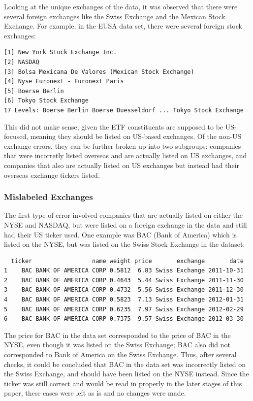 \documentclass[12pt,twoside]{reedthesis}
\newenvironment{Shaded}{\begin{snugshade}}{\end{snugshade}}
\newcommand{\KeywordTok}[1]{\textcolor[rgb]{0.13,0.29,0.53}{\textbf{{#1}}}}
\newcommand{\StringTok}[1]{\textcolor[rgb]{0.31,0.60,0.02}{{#1}}}
\newcommand{\CommentTok}[1]{\textcolor[rgb]{0.56,0.35,0.01}{\textit{{#1}}}}
\newcommand{\NormalTok}[1]{{#1}}
\theoremstyle{definition}
\theoremstyle{definition}
\theoremstyle{definition}
\theoremstyle{remark}
\begin{document}
Looking at the unique exchanges of the data, it was observed that there
were several foreign exchanges like the Swiss Exchange and the Mexican
Stock Exchange. For example, in the EUSA data set, there were several
foreign stock exchanges:
\begin{Shaded}
\end{Shaded}
\begin{verbatim}
[1] New York Stock Exchange Inc.                      
[2] NASDAQ                                            
[3] Bolsa Mexicana De Valores (Mexican Stock Exchange)
[4] Nyse Euronext - Euronext Paris                    
[5] Boerse Berlin                                     
[6] Tokyo Stock Exchange                              
17 Levels: Boerse Berlin Boerse Duesseldorf ... Tokyo Stock Exchange
\end{verbatim}
This did not make sense, given the ETF constituents are supposed to be
US-focused, meaning they should be listed on US-based exchanges. Of the
non-US exchange errors, they can be further broken up into two
subgroups: companies that were incorretly listed overseas and are
actually listed on US exchanges, and companies that also are actually
listed on US exchanges but instead had their overseas exchange tickers
listed.

\subsubsection{Mislabeled Exchanges}\label{mislabeled-exchanges}

The first type of error involved companies that are actually listed on
either the NYSE and NASDAQ, but were listed on a foreign exchange in the
data and still had their US ticker used. One example was BAC (Bank of
America) which is listed on the NYSE, but was listed on the Swiss Stock
Exchange in the dataset:
\begin{verbatim}
  ticker                 name weight price       exchange       date
1    BAC BANK OF AMERICA CORP 0.5812  6.83 Swiss Exchange 2011-10-31
2    BAC BANK OF AMERICA CORP 0.4643  5.44 Swiss Exchange 2011-11-30
3    BAC BANK OF AMERICA CORP 0.4732  5.56 Swiss Exchange 2011-12-30
4    BAC BANK OF AMERICA CORP 0.5823  7.13 Swiss Exchange 2012-01-31
5    BAC BANK OF AMERICA CORP 0.6235  7.97 Swiss Exchange 2012-02-29
6    BAC BANK OF AMERICA CORP 0.7375  9.57 Swiss Exchange 2012-03-30
\end{verbatim}
The price for BAC in the data set corresponded to the price of BAC in
the NYSE, even though it was listed on the Swiss Exchange; BAC also did
not corresponded to Bank of America on the Swiss Exchange. Thus, after
several checks, it could be concluded that BAC in the data set was
incorrectly listed on the Swiss Exchange, and should have been listed on
the NYSE instead. Since the ticker was still correct and would be read
in properly in the later stages of this paper, these cases were left as
is and no changes were made.
\end{document}
